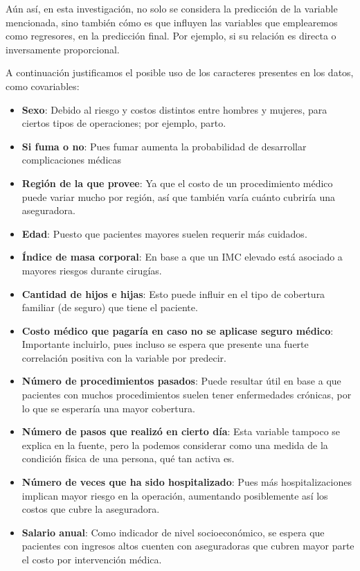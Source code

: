 \documentclass[
]{article}
\providecommand{\tightlist}{%
  \setlength{\itemsep}{0pt}\setlength{\parskip}{0pt}}
\begin{document}
Aún así, en esta investigación, no solo se considera la predicción de la
variable mencionada, sino también cómo es que influyen las variables que
emplearemos como regresores, en la predicción final. Por ejemplo, si su
relación es directa o inversamente proporcional.

A continuación justificamos el posible uso de los caracteres presentes
en los datos, como covariables:

\begin{itemize}
\tightlist
\item
  \textbf{Sexo}: Debido al riesgo y costos distintos entre hombres y
  mujeres, para ciertos tipos de operaciones; por ejemplo, parto.
\item
  \textbf{Si fuma o no}: Pues fumar aumenta la probabilidad de
  desarrollar complicaciones médicas
\item
  \textbf{Región de la que provee}: Ya que el costo de un procedimiento
  médico puede variar mucho por región, así que también varía cuánto
  cubriría una aseguradora.
\item
  \textbf{Edad}: Puesto que pacientes mayores suelen requerir más
  cuidados.
\item
  \textbf{Índice de masa corporal}: En base a que un IMC elevado está
  asociado a mayores riesgos durante cirugías.
\item
  \textbf{Cantidad de hijos e hijas}: Esto puede influir en el tipo de
  cobertura familiar (de seguro) que tiene el paciente.
\item
  \textbf{Costo médico que pagaría en caso no se aplicase seguro
  médico}: Importante incluirlo, pues incluso se espera que presente una
  fuerte correlación positiva con la variable por predecir.
\item
  \textbf{Número de procedimientos pasados}: Puede resultar útil en base
  a que pacientes con muchos procedimientos suelen tener enfermedades
  crónicas, por lo que se esperaría una mayor cobertura.
\item
  \textbf{Número de pasos que realizó en cierto día}: Esta variable
  tampoco se explica en la fuente, pero la podemos considerar como una
  medida de la condición física de una persona, qué tan activa es.
\item
  \textbf{Número de veces que ha sido hospitalizado}: Pues más
  hospitalizaciones implican mayor riesgo en la operación, aumentando
  posiblemente así los costos que cubre la aseguradora.
\item
  \textbf{Salario anual}: Como indicador de nivel socioeconómico, se
  espera que pacientes con ingresos altos cuenten con aseguradoras que
  cubren mayor parte el costo por intervención médica.
\end{itemize}
\end{document}
